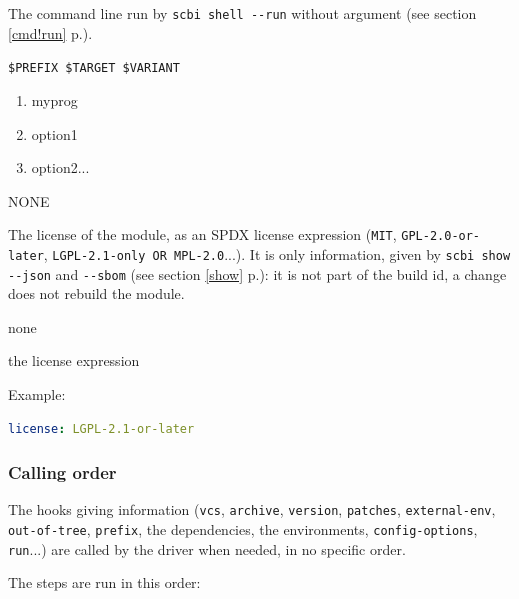 \documentclass[a4paper,12pt,twoside]{article}
\newcommand{\code}[1]{\texttt{#1}}
\newcommand{\seeref}[1]{see section \ref{#1} p.\pageref{#1}}
\newcommand{\ddash}{-{}-}
\begin{document}
\begin{description}[font=\large\texttt]
	\item[run {[}common|<variant>{]}] The command line run by \code{scbi shell \ddash{}run} without argument (\seeref{cmd!run}).

	\begin{description}[font=\textit,style=standard]
		\item[parameter] \tabto{2cm} \code{\$PREFIX \$TARGET \$VARIANT}
		\begin{enumerate}
			\item myprog
			\item option1
			\item option2...
		\end{enumerate}
		\item[return] \tabto{2cm} NONE
	\end{description}

	\item[license] \label{hook-license}The license of the module, as an SPDX license expression (\code{MIT}, \code{GPL-2.0-or-later}, \code{LGPL-2.1-only OR MPL-2.0}...). It is only information, given by \code{scbi show \ddash{}json} and \code{\ddash{}sbom} (\seeref{show}): it is not part of the build id, a change does not rebuild the module.

	\begin{description}[font=\textit,style=standard]
		\item[parameter] \tabto{2cm} none
		\item[return] \tabto{2cm} the license expression
	\end{description}

	Example:
	\begin{lstlisting}[language={yaml}]
license: LGPL-2.1-or-later
\end{lstlisting}

\end{description}

\subsubsection{Calling order}

The hooks giving information (\code{vcs}, \code{archive}, \code{version}, \code{patches}, \code{external-env}, \code{out-of-tree}, \code{prefix}, the dependencies, the environments, \code{config-options}, \code{run}...) are called by the driver when needed, in no specific order.

The steps are run in this order:
\end{document}
